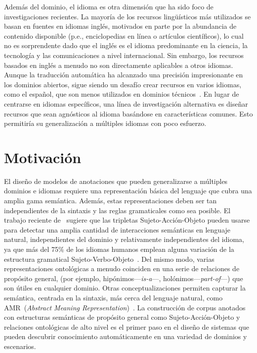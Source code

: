Además del dominio, el idioma es otra dimensión que ha sido foco de investigaciones recientes.
La mayoría de los recursos lingüísticos más utilizados se basan en fuentes en idiomas inglés, motivados en parte por la abundancia de contenido disponible (p.e., enciclopedias en línea o artículos científicos), lo cual no es sorprendente dado que el inglés es el idioma predominante en la ciencia, la tecnología y las comunicaciones a nivel internacional.
Sin embargo, los recursos basados en inglés a menudo no son directamente aplicables a otros idiomas.
Aunque la traducción automática ha alcanzado una precisión impresionante en los dominios abiertos, sigue siendo un desafío crear recursos en varios idiomas, como el español, que son menos utilizados en dominios técnicos~\cite{villegas2018mespen}.
En lugar de centrarse en idiomas específicos, una línea de investigación alternativa es diseñar recursos que sean agnósticos al idioma basándose en características comunes. Esto permitiría su generalización a múltiples idiomas con poco esfuerzo.

\section{Motivación}
\label{chap1:motivation}

El diseño de modelos de anotaciones que pueden generalizarse a múltiples dominios e idiomas requiere una representación básica del lenguaje que cubra una amplia gama semántica.
Además, estas representaciones deben ser tan independientes de la sintaxis y las reglas gramaticales como sea posible.
El trabajo reciente de~\citet{estevez2018gathering} sugiere que las tripletas Sujeto-Acción-Objeto pueden usarse para detectar una amplia cantidad de interacciones semánticas en lenguaje natural, independientes del dominio y relativamente independientes del idioma, ya que más del 75\% de los idiomas humanos emplean alguna variación de la estructura gramatical Sujeto-Verbo-Objeto~\cite{crystal2004cambridge}.
Del mismo modo, varias representaciones ontológicas a menudo coinciden en una serie de relaciones de propósito general, (por ejemplo, hipónimos---\textit{is-a}---,  holónimos---\textit{part-of}---) que son útiles en cualquier dominio.
Otras conceptualizaciones permiten capturar la semántica, centrada en la sintaxis, más cerca del lenguaje natural, como  AMR~(\textit{Abstract Meaning Representation})~\cite{banarescu2013abstract}.
La construcción de corpus anotados con estructuras semánticas de propósito general como Sujeto-Acción-Objeto y relaciones ontológicas de alto nivel es el primer paso en el diseño de sistemas que pueden descubrir conocimiento automáticamente en una variedad de dominios y escenarios.

